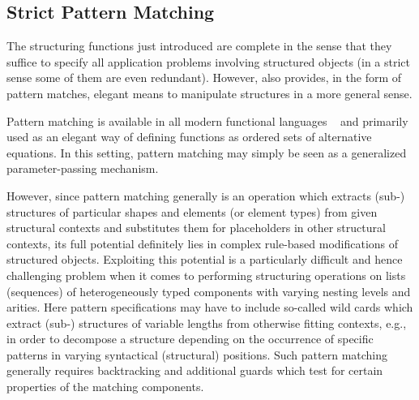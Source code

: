 \subsection{Strict Pattern Matching}
The structuring functions just introduced
 are complete in the sense that they suffice to specify all
application problems involving structured objects (in a strict sense some of them are even
redundant). However, \kir also provides, in the form of {\mys pattern matches}, elegant means to
manipulate structures in a more general sense. 

{\mys Pattern matching} is available in all modern functional languages ~\cite{turn86,lavi87,huda88} and primarily used
as an elegant way of defining functions as ordered sets of alternative equations. In this setting,
pattern matching may simply be seen as a generalized parameter-passing mechanism. 

However, since pattern matching generally is an operation which extracts (sub-) structures of
particular shapes and elements (or element types) from given structural contexts and substitutes
them for placeholders in other structural contexts, its full potential definitely lies in
complex {\mys rule-based modifications} of structured objects. Exploiting this potential is 
a particularly difficult and hence challenging problem when it comes to performing 
structuring operations on lists (sequences) of heterogeneously typed components with varying 
nesting levels and arities. Here pattern specifications may have to include so-called
{\mys wild cards} which extract (sub-) structures of variable lengths from otherwise fitting contexts, e.g., in order to decompose a structure depending on the occurrence of specific patterns
in varying syntactical (structural) positions. Such pattern matching generally requires
backtracking and additional {\mys guards} which test for certain properties of the matching
components.  
 
